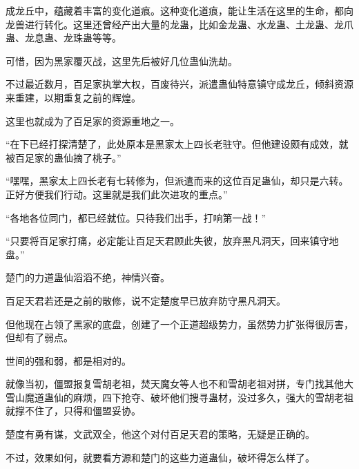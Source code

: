 \begin{this_body}
成龙丘中，蕴藏着丰富的变化道痕。这种变化道痕，能让生活在这里的生命，都向龙兽进行转化。这里还曾经产出大量的龙蛊，比如金龙蛊、水龙蛊、土龙蛊、龙爪蛊、龙息蛊、龙珠蛊等等。

可惜，因为黑家覆灭战，这里先后被好几位蛊仙洗劫。

不过最近数月，百足家执掌大权，百废待兴，派遣蛊仙特意镇守成龙丘，倾斜资源来重建，以期重复之前的辉煌。

这里也就成为了百足家的资源重地之一。

“在下已经打探清楚了，此处原本是黑家太上四长老驻守。但他建设颇有成效，就被百足家的蛊仙摘了桃子。”

“嘿嘿，黑家太上四长老有七转修为，但派遣而来的这位百足蛊仙，却只是六转。正好方便我们行动。这里就是我们此次进攻的重点。”

“各地各位同门，都已经就位。只待我们出手，打响第一战！”

“只要将百足家打痛，必定能让百足天君顾此失彼，放弃黑凡洞天，回来镇守地盘。”

楚门的力道蛊仙滔滔不绝，神情兴奋。

百足天君若还是之前的散修，说不定楚度早已放弃防守黑凡洞天。

但他现在占领了黑家的底盘，创建了一个正道超级势力，虽然势力扩张得很厉害，但却有了弱点。

世间的强和弱，都是相对的。

就像当初，僵盟报复雪胡老祖，焚天魔女等人也不和雪胡老祖对拼，专门找其他大雪山魔道蛊仙的麻烦，四下抢夺、破坏他们搜寻蛊材，没过多久，强大的雪胡老祖就撑不住了，只得和僵盟妥协。

楚度有勇有谋，文武双全，他这个对付百足天君的策略，无疑是正确的。

不过，效果如何，就要看方源和楚门的这些力道蛊仙，破坏得怎么样了。

\end{this_body}

